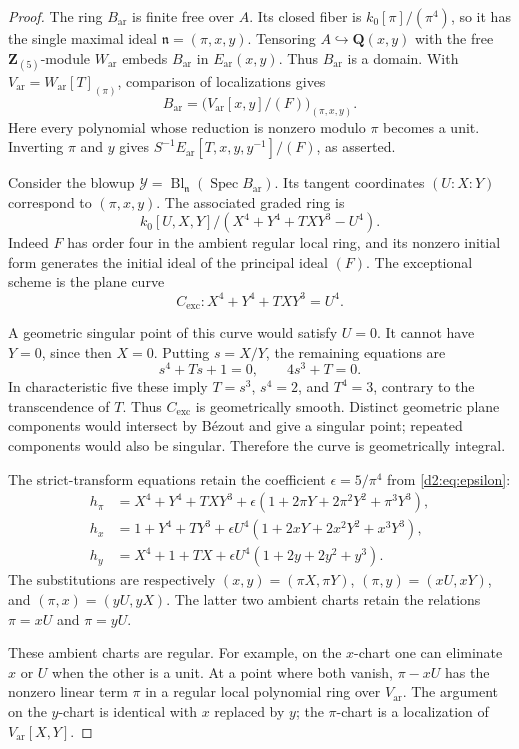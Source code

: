 \documentclass[11pt,a4paper]{amsart}
\numberwithin{equation}{section}
\theoremstyle{definition}
\theoremstyle{remark}
\newcommand{\DtwoZZ}{\mathbf{Z}}
\newcommand{\DtwoQQ}{\mathbf{Q}}
\newcommand{\DtwocY}{\mathcal Y}
\newcommand{\Dtwofn}{\mathfrak n}
\newcommand{\Dtwoar}{\mathrm{ar}}
\newcommand{\DtwoSpec}{\operatorname{Spec}}
\begin{document}
\begin{proof}
The ring \(B_{\Dtwoar}\) is finite free over \(A\).
Its closed fiber is \(k_0[\pi]/(\pi^4)\), so it has the single maximal
ideal \(\Dtwofn=(\pi,x,y)\).
Tensoring \(A\hookrightarrow\DtwoQQ(x,y)\) with the free
\(\DtwoZZ _{(5)}\)-module \(W_{\Dtwoar}\) embeds \(B_{\Dtwoar}\) in
\(E_{\Dtwoar}(x,y)\). Thus \(B_{\Dtwoar}\) is a domain.
With \(V_{\Dtwoar}=W_{\Dtwoar}[T]_{(\pi)}\), comparison of localizations gives
\[
 B_{\Dtwoar}=
 \bigl(V_{\Dtwoar}[x,y]/(F)\bigr)_{(\pi,x,y)}.
\]
Here every polynomial whose reduction is nonzero modulo \(\pi\)
becomes a unit. Inverting \(\pi\) and \(y\) gives
\(S^{-1}E_{\Dtwoar}[T,x,y,y^{-1}]/(F)\), as asserted.

Consider the blowup
\(\DtwocY=\operatorname{Bl}_{\Dtwofn}(\DtwoSpec B_{\Dtwoar})\).
Its tangent coordinates \((U:X:Y)\) correspond to \((\pi,x,y)\).
The associated graded ring is
\[
 k_0[U,X,Y]/(X^4+Y^4+TXY^3-U^4).
\]
Indeed \(F\) has order four in the ambient regular local ring, and its
nonzero initial form generates the initial ideal of the principal
ideal \((F)\). The exceptional scheme is the plane curve
\[
 C_{\mathrm{exc}}\colon X^4+Y^4+TXY^3=U^4.
\]

A geometric singular point of this curve would satisfy \(U=0\).
It cannot have \(Y=0\), since then \(X=0\).
Putting \(s=X/Y\), the remaining equations are
\[
 s^4+Ts+1=0,\qquad 4s^3+T=0.
\]
In characteristic five these imply \(T=s^3\), \(s^4=2\), and
\(T^4=3\), contrary to the transcendence of \(T\).
Thus \(C_{\mathrm{exc}}\) is geometrically smooth.
Distinct geometric plane components would intersect by B\'ezout and
give a singular point; repeated components would also be singular.
Therefore the curve is geometrically integral.

The strict-transform equations retain the coefficient
\(\epsilon=5/\pi^4\) from \eqref{d2:eq:epsilon}:
\begin{align*}
 h_\pi&=X^4+Y^4+TXY^3+
       \epsilon(1+2\pi Y+2\pi^2Y^2+\pi^3Y^3),\\
 h_x&=1+Y^4+TY^3+
       \epsilon U^4(1+2xY+2x^2Y^2+x^3Y^3),\\
 h_y&=X^4+1+TX+
       \epsilon U^4(1+2y+2y^2+y^3).
\end{align*}
The substitutions are respectively
\((x,y)=(\pi X,\pi Y)\),
\((\pi,y)=(xU,xY)\), and
\((\pi,x)=(yU,yX)\).
The latter two ambient charts retain the relations
\(\pi=xU\) and \(\pi=yU\).

These ambient charts are regular.
For example, on the \(x\)-chart one can eliminate \(x\) or \(U\) when
the other is a unit. At a point where both vanish,
\(\pi-xU\) has the nonzero linear term \(\pi\) in a regular local
polynomial ring over \(V_{\Dtwoar}\).
The argument on the \(y\)-chart is identical with \(x\) replaced by
\(y\); the \(\pi\)-chart is a localization of \(V_{\Dtwoar}[X,Y]\).


\end{proof}
\end{document}
